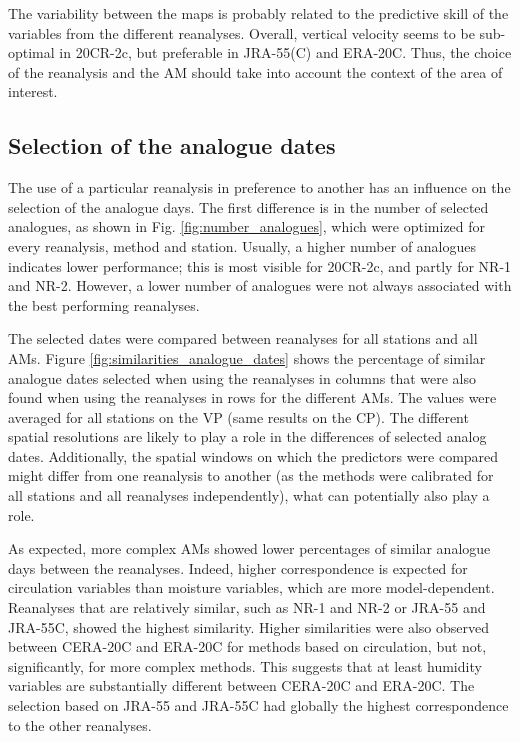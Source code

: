 \documentclass[smallextended]{svjour3}       %
\begin{document}
	The variability between the maps is probably related to the predictive skill of the variables from the different reanalyses. Overall, vertical velocity seems to be sub-optimal in 20CR-2c, but preferable in JRA-55(C) and ERA-20C. Thus, the choice of the reanalysis and the AM should take into account the context of the area of interest.
	
	
	\subsection{Selection of the analogue dates}
	
	The use of a particular reanalysis in preference to another has an influence on the selection of the analogue days. The first difference is in the number of selected analogues, as shown in Fig. \ref{fig:number_analogues}, which were optimized for every reanalysis, method and station. Usually, a higher number of analogues indicates lower performance; this is most visible for 20CR-2c, and partly for NR-1 and NR-2. However, a lower number of analogues were not always associated with the best performing reanalyses.
	
	The selected dates were compared between reanalyses for all stations and all AMs. Figure \ref{fig:similarities_analogue_dates} shows the percentage of similar analogue dates selected when using the reanalyses in columns that were also found when using the reanalyses in rows for the different AMs. The values were averaged for all stations on the VP (same results on the CP). The different spatial resolutions are likely to play a role in the differences of selected analog dates. Additionally, the spatial windows on which the predictors were compared might differ from one reanalysis to another (as the methods were calibrated for all stations and all reanalyses independently), what can potentially also play a role.
	
	As expected, more complex AMs showed lower percentages of similar analogue days between the reanalyses. Indeed, higher correspondence is expected for circulation variables than moisture variables, which are more model-dependent. Reanalyses that are relatively similar, such as NR-1 and NR-2 or JRA-55 and JRA-55C, showed the highest similarity. Higher similarities were also observed between CERA-20C and ERA-20C for methods based on circulation, but not, significantly, for more complex methods. This suggests that at least humidity variables are substantially different between CERA-20C and ERA-20C. The selection based on JRA-55 and JRA-55C had globally the highest correspondence to the other reanalyses.
	
\end{document}
